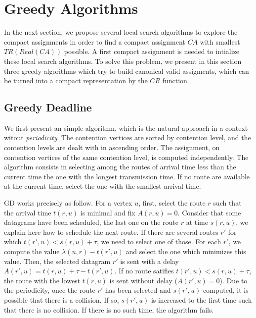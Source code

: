 \documentclass[english]{article}
\begin{document}
\section{Greedy Algorithms}
 
 In the next section, we propose several local search algorithms to explore the compact assignments in order to find a compact assignment $CA$ with smallest $TR(Real(CA))$ possible. A first compact assignment is needed to intialize these local search algorithms. To solve this problem, we present in this section three greedy algorithms which try to build canonical valid assigments, which can be turned into a compact representation by the $CR$ function.

\subsection{Greedy Deadline}

We first present an simple algorithm, which is the natural approach in a context witout \emph{periodicity}.
The contention vertices are sorted by contention level, and the contention levels are dealt with in ascending order. The assignment, on contention vertices of the same contention level, is computed independently. The \greedydeadline algorithm consists in selecting among the routes of arrival time less than the current time the one with the longest transmission time. If no route are available at the current time, select the one with the smallest arrival time.

GD works precisely as follow. For a vertex $u$, first, select the route $r$ such that the arrival time $t(r,u)$ is minimal and fix $A(r,u) = 0$. Consider that some datagrams have been scheduled, the last one on the route $r$ at time $s(r,u)$, we explain here how to schedule the next route.  If there are several routes $r'$ for which $t(r',u) < s(r,u) + \tau $, we need to select one of those. For each $r'$, we compute the value $\lambda(u,r) - t(r',u)$ and select the one which minimizes this value. Then, the selected datagram $r'$ is sent with a delay $A(r',u) = t(r,u) + \tau - t(r',u)$. If no route satifies $t(r',u) < s(r,u) + \tau$, the route with the lowest $t(r,u)$ is sent without delay ($A(r',u) = 0$). 
Due to the periodicity, once the route $r'$ has been selected and $s(r',u)$ computed, it is possible that there is a collision. If so, $s(r',u)$ is increased to the first time such that there is no collision. If there is no such time, the algorithm fails.
\end{document}
